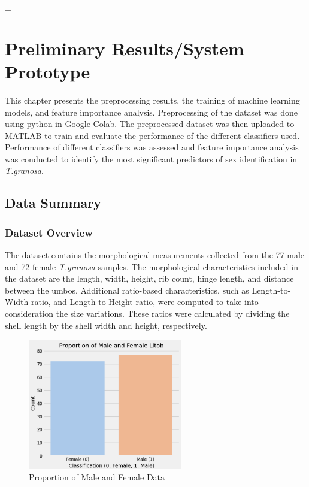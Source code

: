 \ensuremath{\pm}


\chapter{Preliminary Results/System Prototype}
This chapter presents the preprocessing results, the training of machine learning models, and feature importance analysis. Preprocessing of the dataset was done using python in Google Colab. The preprocessed dataset was then uploaded to MATLAB to train and evaluate the performance of the different classifiers used. Performance of different classifiers was assessed and feature importance analysis was conducted to identify the most significant predictors of sex identification in \textit{T.granosa}.

\section{Data Summary}
\subsection{Dataset Overview}

The dataset contains the morphological measurements collected from the 77 male and 72 female \textit{T.granosa} samples. The morphological characteristics included in the dataset are the length, width, height, rib count, hinge length, and distance between the umbos. Additional ratio-based characteristics, such as Length-to-Width ratio, and Length-to-Height ratio, were computed to take into consideration the size variations. These ratios were calculated by dividing the shell length by the shell width and height, respectively. 

\begin{figure}[!htbp]
	\centering
	\includegraphics[width=0.6\textwidth]{figures/test-train.png}
	\caption{Proportion of Male and Female Data}
	\label{fig:test-train}
\end{figure}

